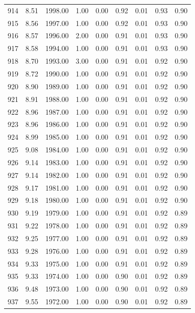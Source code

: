 \documentclass{article}\usepackage[]{graphicx}\usepackage[]{color}
\begin{document}
\begin{longtable}{rrrrrrrrr}
  914 & 8.51 & 1998.00 & 1.00 & 0.00 & 0.92 & 0.01 & 0.93 & 0.90 \\ 
  915 & 8.56 & 1997.00 & 1.00 & 0.00 & 0.92 & 0.01 & 0.93 & 0.90 \\ 
  916 & 8.57 & 1996.00 & 2.00 & 0.00 & 0.91 & 0.01 & 0.93 & 0.90 \\ 
  917 & 8.58 & 1994.00 & 1.00 & 0.00 & 0.91 & 0.01 & 0.93 & 0.90 \\ 
  918 & 8.70 & 1993.00 & 3.00 & 0.00 & 0.91 & 0.01 & 0.92 & 0.90 \\ 
  919 & 8.72 & 1990.00 & 1.00 & 0.00 & 0.91 & 0.01 & 0.92 & 0.90 \\ 
  920 & 8.90 & 1989.00 & 1.00 & 0.00 & 0.91 & 0.01 & 0.92 & 0.90 \\ 
  921 & 8.91 & 1988.00 & 1.00 & 0.00 & 0.91 & 0.01 & 0.92 & 0.90 \\ 
  922 & 8.96 & 1987.00 & 1.00 & 0.00 & 0.91 & 0.01 & 0.92 & 0.90 \\ 
  923 & 8.96 & 1986.00 & 1.00 & 0.00 & 0.91 & 0.01 & 0.92 & 0.90 \\ 
  924 & 8.99 & 1985.00 & 1.00 & 0.00 & 0.91 & 0.01 & 0.92 & 0.90 \\ 
  925 & 9.08 & 1984.00 & 1.00 & 0.00 & 0.91 & 0.01 & 0.92 & 0.90 \\ 
  926 & 9.14 & 1983.00 & 1.00 & 0.00 & 0.91 & 0.01 & 0.92 & 0.90 \\ 
  927 & 9.14 & 1982.00 & 1.00 & 0.00 & 0.91 & 0.01 & 0.92 & 0.90 \\ 
  928 & 9.17 & 1981.00 & 1.00 & 0.00 & 0.91 & 0.01 & 0.92 & 0.90 \\ 
  929 & 9.18 & 1980.00 & 1.00 & 0.00 & 0.91 & 0.01 & 0.92 & 0.90 \\ 
  930 & 9.19 & 1979.00 & 1.00 & 0.00 & 0.91 & 0.01 & 0.92 & 0.89 \\ 
  931 & 9.22 & 1978.00 & 1.00 & 0.00 & 0.91 & 0.01 & 0.92 & 0.89 \\ 
  932 & 9.25 & 1977.00 & 1.00 & 0.00 & 0.91 & 0.01 & 0.92 & 0.89 \\ 
  933 & 9.28 & 1976.00 & 1.00 & 0.00 & 0.91 & 0.01 & 0.92 & 0.89 \\ 
  934 & 9.33 & 1975.00 & 1.00 & 0.00 & 0.91 & 0.01 & 0.92 & 0.89 \\ 
  935 & 9.33 & 1974.00 & 1.00 & 0.00 & 0.90 & 0.01 & 0.92 & 0.89 \\ 
  936 & 9.48 & 1973.00 & 1.00 & 0.00 & 0.90 & 0.01 & 0.92 & 0.89 \\ 
  937 & 9.55 & 1972.00 & 1.00 & 0.00 & 0.90 & 0.01 & 0.92 & 0.89 \\ 

\end{longtable}
\end{document}
